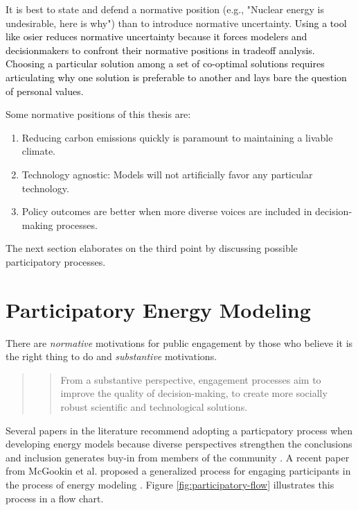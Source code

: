 It is best to state and defend a normative position (e.g., "Nuclear energy is
undesirable, here is why") than to introduce normative uncertainty.
\textcolor{black}{Using a tool like \ac{osier} reduces normative uncertainty
because it forces modelers and decisionmakers to confront their normative
positions in tradeoff analysis. Choosing a particular solution among a set of
co-optimal solutions requires articulating why one solution is preferable to
another and lays bare the question of personal values.}

Some normative positions of this thesis are:
\begin{enumerate}
    \item Reducing carbon emissions quickly is paramount to maintaining a
    livable climate.
    \item Technology agnostic: Models will not artificially favor any particular
    technology.
    \item Policy outcomes are better when more diverse voices are included in
    decision-making processes.
\end{enumerate}

The next section elaborates on the third point by discussing possible
participatory processes.

\section{Participatory Energy Modeling}
\label{section:participation-modeling}

There are \textit{normative} motivations for public engagement by those who
believe it is the right thing to do \cite{wilsdon_see-through_2004} and
\textit{substantive} motivations.
\begin{quote}
    \blockcquote[p. 39]{wilsdon_see-through_2004}{From a substantive
    perspective, engagement processes aim to improve the quality of
    decision-making, to create more socially robust scientific and technological
    solutions.}
\end{quote}
Several papers in the literature recommend adopting a particpatory process when
developing energy models because diverse perspectives strengthen the conclusions
and inclusion generates buy-in from members of the community
\cite{moallemi_participatory_2018, mcgookin_systematically_2022,
venturini_linking_2019, bertsch_participatory_2016}. A recent paper from
McGookin et al. proposed a generalized process for engaging participants in the
process of energy modeling \cite{mcgookin_advancing_2024}. Figure
\ref{fig:participatory-flow} illustrates this process in a flow chart.

